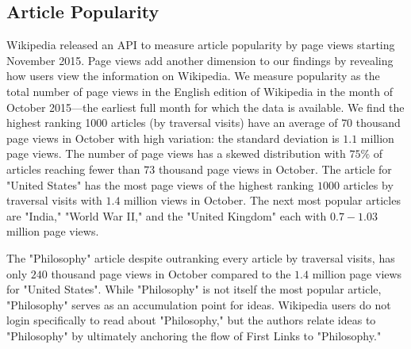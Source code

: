 \documentclass[pre,twocolumn,twoside,superscriptaddress,floatfix, aps, 10pt]{revtex4-1}
\begin{document}
\subsection{Article Popularity}

Wikipedia released an API to measure article popularity by page views
starting November 2015. Page views add another dimension to our
findings by revealing 
how users view the information on Wikipedia. 
We measure popularity as the total number 
of page views in the English edition of Wikipedia in the month of 
October 2015---the earliest full month for which the data is available. 
We find the highest ranking 1000 articles (by traversal visits) have an average of
$70$ thousand page views in October with high variation: the standard deviation 
is $1.1$ million page views. 
The number of page views has a skewed distribution with $75\%$ of articles
reaching fewer than $73$ thousand page views in October.
The article for "United States" has the most page 
views of the highest ranking $1000$ articles by traversal visits with 
$1.4$ million views in October. The next most popular articles are 
"India," "World War II," and the "United Kingdom" each with $0.7-1.03$ million page views. 


The "Philosophy" article despite outranking every article by traversal visits,
has only $240$ thousand page views in October compared to the $1.4$ million
page views for "United States".
While "Philosophy" is not itself the most popular article, "Philosophy" serves as 
an accumulation point for ideas. Wikipedia users do not login specifically
to read about "Philosophy," but the authors relate ideas to "Philosophy" 
by ultimately anchoring the flow of First Links to "Philosophy."
\end{document}
